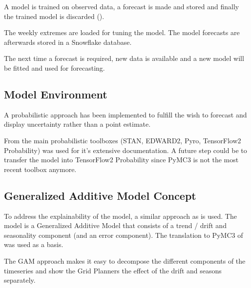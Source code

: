 \documentclass[letterpaper,10pt,english]{sphinxmanual}
\let\sphinxpxdimen\pdfpxdimen\else\newdimen\sphinxpxdimen
\begin{document}
A model is trained on observed data, a forecast is made and stored and finally the trained model is discarded ({\hyperref[\detokenize{autoapi/src/forecast/forecast/index:src.forecast.forecast.forecast}]{}}).

\noindent{\hspace*{\fill}\sphinxincludegraphics[height=250\sphinxpxdimen]{{process_modeling}.png}\hspace*{\fill}}

The weekly extremes are loaded for tuning the model. The model forecasts are afterwards stored in a Snowflake database.

The next time a forecast is required, new data is available and a new model will be fitted and used for forecasting.


\subsection{Model Environment}
\label{\detokenize{modeling:model-environment}}
A probabilistic approach has been implemented to fulfill the wish to forecast and display uncertainty rather than a point estimate.

From the main probabilistic toolboxes (STAN, EDWARD2, Pyro, TensorFlow2 Probability)  was used for it’s extensive documentation.
A future step could be to transfer the model into TensorFlow2 Probability since PyMC3 is not the most recent toolbox anymore.


\subsection{Generalized Additive Model Concept}
\label{\detokenize{modeling:generalized-additive-model-concept}}
To address the explainability of the model, a similar approach as  is used.
The model is a Generalized Additive Model  that consists of a trend / drift and seasonality component (and an error component).
The translation to PyMC3 of  was used as a basis.

The GAM approach makes it easy to decompose the different components of the timeseries and show the Grid Planners the effect of the drift and seasons separately.
\end{document}
